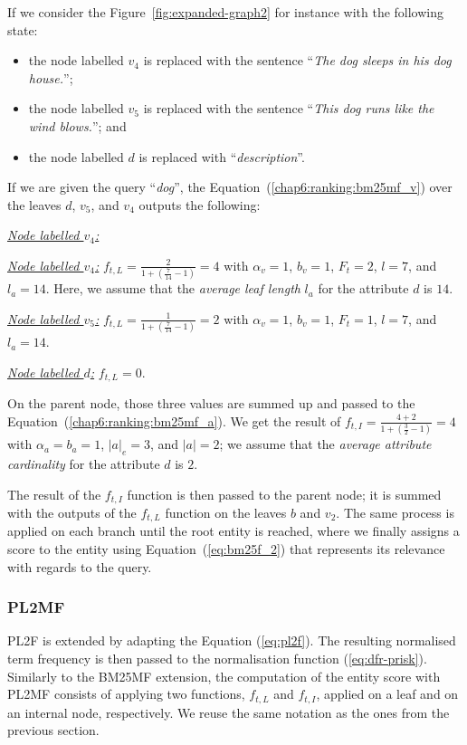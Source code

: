If we consider the Figure~\ref{fig:expanded-graph2} for instance with the following state:
\begin{itemize}
	\item the node labelled $v_4$ is replaced with the sentence ``\textit{The dog sleeps in his dog house.}'';
	\item the node labelled $v_5$ is replaced with the sentence ``\textit{This dog runs like the wind blows.}''; and
	\item the node labelled $d$ is replaced with ``\textit{description}''.
\end{itemize}
If we are given the query ``\textit{dog}'', the Equation~(\ref{chap6:ranking:bm25mf_v}) over the leaves $d$, $v_5$, and $v_4$ outputs the following:
\begin{labeling}{\textit{\underline{Node labelled $v_4$:}}}
	\item[\textit{\underline{Node labelled $v_4$:}}] $f_{t,L} = \frac{2}{1 + (\frac{7}{14} - 1)} = 4$ with $\alpha_v=1$, $b_v=1$, $F_t=2$, $l=7$, and $l_a=14$. Here, we assume that the \emph{average leaf length} $l_a$ for the attribute $d$ is $14$.
	\item[\textit{\underline{Node labelled $v_5$:}}] $f_{t,L} = \frac{1}{1 + (\frac{7}{14} - 1)} = 2$ with $\alpha_v=1$, $b_v=1$, $F_t=1$, $l=7$, and $l_a=14$.
	\item[\textit{\underline{Node labelled $d$:}}] $f_{t,L} = 0$.
\end{labeling}
On the parent node, those three values are summed up and passed to the Equation~(\ref{chap6:ranking:bm25mf_a}). We get the result of $f_{t,I} = \frac{4 + 2}{1 + (\frac{3}{2} - 1)} = 4$ with $\alpha_a=b_a=1$, $\left|{a}\right|_e=3$, and $\left|{a}\right| = 2$; we assume that the \emph{average attribute cardinality} for the attribute $d$ is $2$.

The result of the $f_{t,I}$ function is then passed to the parent node; it is summed with the outputs of the $f_{t,L}$ function on the leaves $b$ and $v_2$. The same process is applied on each branch until the root entity is reached, where we finally assigns a score to the entity using Equation~(\ref{eq:bm25f_2}) that represents its relevance with regards to the query.

\subsubsection{PL2MF}
\label{sec:pl2mf-function}

PL2F is extended by adapting the Equation (\ref{eq:pl2f}). The resulting normalised term frequency is then passed to the normalisation function (\ref{eq:dfr-prisk}).
Similarly to the \gls{BM25MF} extension, the computation of the entity score with \gls{PL2MF} consists of applying two functions, $f_{t,L}$ and $f_{t,I}$, applied on a leaf and on an internal node, respectively. We reuse the same notation as the ones from the previous section.\\ 

